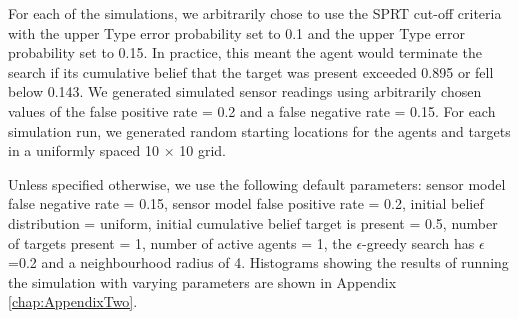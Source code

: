 \par For each of the simulations, we arbitrarily chose to use the SPRT cut-off criteria with the upper Type  error probability set to 0.1 and the upper Type  error probability set to 0.15. In practice, this meant the agent would terminate the search if its cumulative belief that the target was present exceeded 0.895 or fell below 0.143. We generated simulated sensor readings using arbitrarily chosen values of the false positive rate = 0.2 and a false negative rate = 0.15. For each simulation run, we generated random starting locations for the agents and targets in a uniformly spaced 10 $\times$ 10 grid. 
\par Unless specified otherwise, we use the following default parameters: sensor model false negative rate = 0.15, sensor model false positive rate = 0.2, initial belief distribution = uniform, initial cumulative belief target is present = 0.5, number of targets present = 1, number of active agents = 1, the $\epsilon$-greedy search has $\epsilon$=0.2 and a neighbourhood radius of 4. Histograms showing the results of running the simulation with varying parameters are shown in Appendix \ref{chap:AppendixTwo}.





